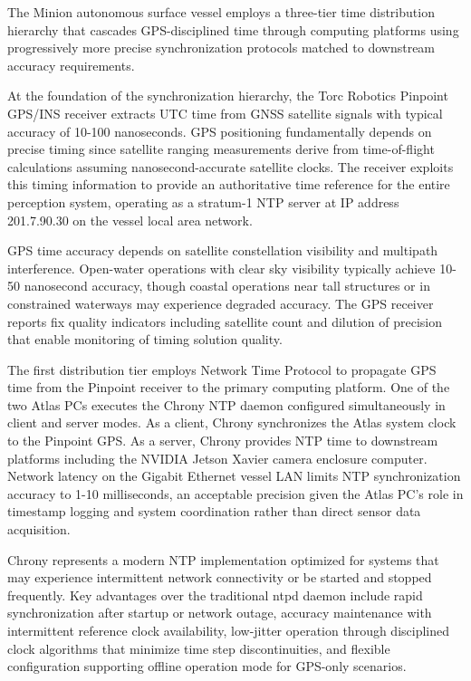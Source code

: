 \documentclass{erauthesis}
\begin{document}
The Minion autonomous surface vessel employs a three-tier time distribution hierarchy that cascades GPS-disciplined time through computing platforms using progressively more precise synchronization protocols matched to downstream accuracy requirements.


At the foundation of the synchronization hierarchy, the Torc Robotics Pinpoint GPS/INS receiver extracts UTC time from GNSS satellite signals with typical accuracy of 10-100 nanoseconds.
GPS positioning fundamentally depends on precise timing since satellite ranging measurements derive from time-of-flight calculations assuming nanosecond-accurate satellite clocks.
The receiver exploits this timing information to provide an authoritative time reference for the entire perception system, operating as a stratum-1 NTP server at IP address 201.7.90.30 on the vessel local area network.

GPS time accuracy depends on satellite constellation visibility and multipath interference.
Open-water operations with clear sky visibility typically achieve 10-50 nanosecond accuracy, though coastal operations near tall structures or in constrained waterways may experience degraded accuracy.
The GPS receiver reports fix quality indicators including satellite count and dilution of precision that enable monitoring of timing solution quality.


The first distribution tier employs Network Time Protocol to propagate GPS time from the Pinpoint receiver to the primary computing platform.
One of the two Atlas PCs executes the Chrony NTP daemon configured simultaneously in client and server modes.
As a client, Chrony synchronizes the Atlas system clock to the Pinpoint GPS.
As a server, Chrony provides NTP time to downstream platforms including the NVIDIA Jetson Xavier camera enclosure computer.
Network latency on the Gigabit Ethernet vessel LAN limits NTP synchronization accuracy to 1-10 milliseconds, an acceptable precision given the Atlas PC's role in timestamp logging and system coordination rather than direct sensor data acquisition.

Chrony represents a modern NTP implementation optimized for systems that may experience intermittent network connectivity or be started and stopped frequently.
Key advantages over the traditional ntpd daemon include rapid synchronization after startup or network outage, accuracy maintenance with intermittent reference clock availability, low-jitter operation through disciplined clock algorithms that minimize time step discontinuities, and flexible configuration supporting offline operation mode for GPS-only scenarios.
\end{document}
